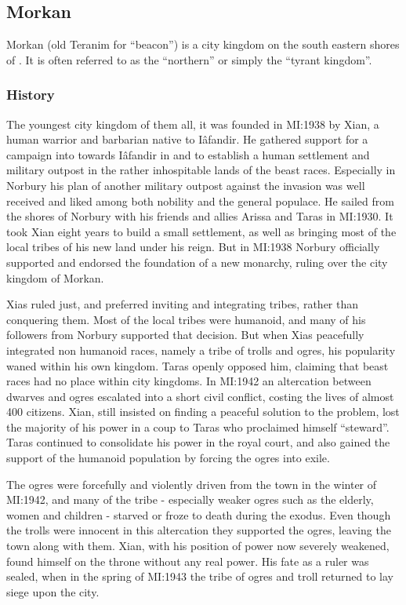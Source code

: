 \subsection{Morkan}
\label{sec:Morkan}


Morkan (old Teranim for ``beacon'') is a city kingdom on the south eastern
shores of . It is often referred to as the ``northern''
or simply the ``tyrant kingdom''.

\subsubsection{History}

The youngest city kingdom of them all, it was founded in MI:1938 by Xian, a
human warrior and barbarian native to Iâfandir. He gathered support for a
campaign into towards Iâfandir in  and
 to establish a human settlement and military outpost in
the rather inhospitable lands of the beast races. Especially in Norbury his
plan of another military outpost against the invasion was well received and
liked among both nobility and the general populace. He sailed from the shores
of Norbury with his friends and allies Arissa and Taras in MI:1930. It took
Xian eight years to build a small settlement, as well as bringing most of the
local tribes of his new land under his reign. But in MI:1938 Norbury
officially supported and endorsed the foundation of a new monarchy, ruling
over the city kingdom of Morkan.

Xias ruled just, and preferred inviting and integrating tribes, rather than
conquering them. Most of the local tribes were humanoid, and many of his
followers from Norbury supported that decision. But when Xias peacefully
integrated non humanoid races, namely a tribe of trolls and ogres, his
popularity waned within his own kingdom. Taras openly opposed him, claiming
that beast races had no place within city kingdoms. In MI:1942 an
altercation between dwarves and ogres escalated into a short civil conflict,
costing the lives of almost 400 citizens. Xian, still insisted on finding a
peaceful solution to the problem, lost the majority of his power in a coup to
Taras who proclaimed himself ``steward''. Taras continued to
consolidate his power in the royal court, and also gained the support of the
humanoid population by forcing the ogres into exile.

The ogres were forcefully and violently driven from the town in the winter of
MI:1942, and many of the tribe - especially weaker ogres such as the
elderly, women and children - starved or froze to death during the exodus. Even
though the trolls were innocent in this altercation they supported the ogres,
leaving the town along with them. Xian, with his position of power now
severely weakened, found himself on the throne without any real power. His
fate as a ruler was sealed, when in the spring of MI:1943 the tribe of
ogres and troll returned to lay siege upon the city.

